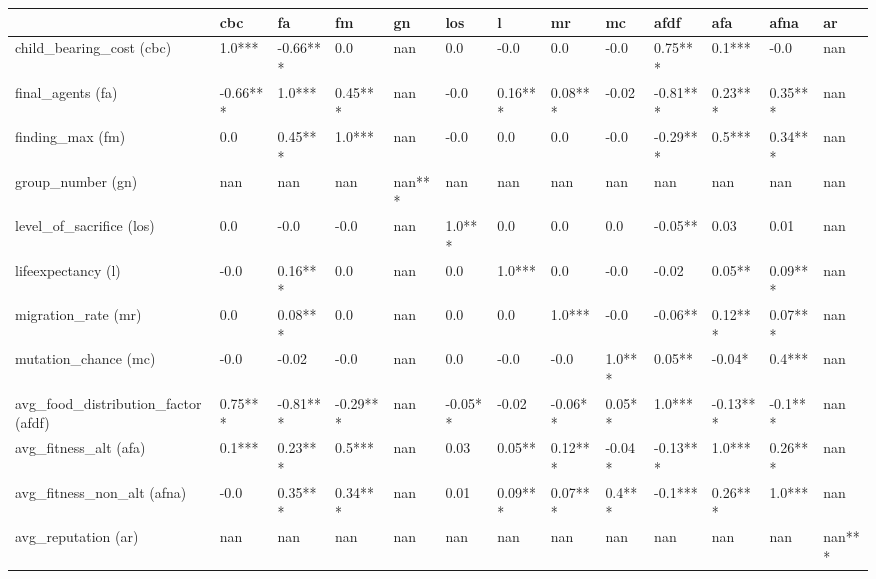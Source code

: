 \begin{tabular}{lllllllllllll}
\toprule
{} &       cbc &        fa &        fm &      gn &      los &        l &       mr &      mc &      afdf &       afa &     afna &      ar \\
\midrule
child\_bearing\_cost (cbc)            &    1.0*** &  -0.66*** &       0.0 &     nan &      0.0 &     -0.0 &      0.0 &    -0.0 &   0.75*** &    0.1*** &     -0.0 &     nan \\
final\_agents (fa)                   &  -0.66*** &    1.0*** &   0.45*** &     nan &     -0.0 &  0.16*** &  0.08*** &   -0.02 &  -0.81*** &   0.23*** &  0.35*** &     nan \\
finding\_max (fm)                    &       0.0 &   0.45*** &    1.0*** &     nan &     -0.0 &      0.0 &      0.0 &    -0.0 &  -0.29*** &    0.5*** &  0.34*** &     nan \\
group\_number (gn)                   &       nan &       nan &       nan &  nan*** &      nan &      nan &      nan &     nan &       nan &       nan &      nan &     nan \\
level\_of\_sacrifice (los)            &       0.0 &      -0.0 &      -0.0 &     nan &   1.0*** &      0.0 &      0.0 &     0.0 &   -0.05** &      0.03 &     0.01 &     nan \\
lifeexpectancy (l)                  &      -0.0 &   0.16*** &       0.0 &     nan &      0.0 &   1.0*** &      0.0 &    -0.0 &     -0.02 &    0.05** &  0.09*** &     nan \\
migration\_rate (mr)                 &       0.0 &   0.08*** &       0.0 &     nan &      0.0 &      0.0 &   1.0*** &    -0.0 &   -0.06** &   0.12*** &  0.07*** &     nan \\
mutation\_chance (mc)                &      -0.0 &     -0.02 &      -0.0 &     nan &      0.0 &     -0.0 &     -0.0 &  1.0*** &    0.05** &    -0.04* &   0.4*** &     nan \\
avg\_food\_distribution\_factor (afdf) &   0.75*** &  -0.81*** &  -0.29*** &     nan &  -0.05** &    -0.02 &  -0.06** &  0.05** &    1.0*** &  -0.13*** &  -0.1*** &     nan \\
avg\_fitness\_alt (afa)               &    0.1*** &   0.23*** &    0.5*** &     nan &     0.03 &   0.05** &  0.12*** &  -0.04* &  -0.13*** &    1.0*** &  0.26*** &     nan \\
avg\_fitness\_non\_alt (afna)          &      -0.0 &   0.35*** &   0.34*** &     nan &     0.01 &  0.09*** &  0.07*** &  0.4*** &   -0.1*** &   0.26*** &   1.0*** &     nan \\
avg\_reputation (ar)                 &       nan &       nan &       nan &     nan &      nan &      nan &      nan &     nan &       nan &       nan &      nan &  nan*** \\
\bottomrule
\end{tabular}
